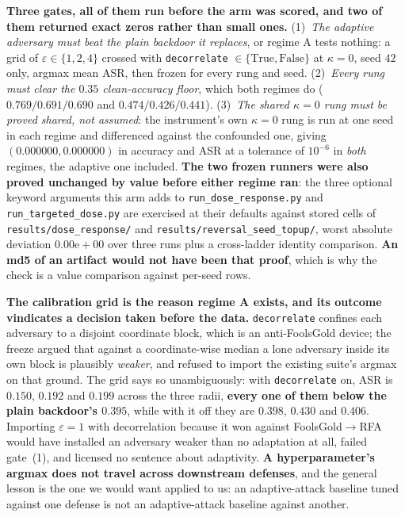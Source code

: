 \documentclass{article}
\begin{document}
\textbf{Three gates, all of them run before the arm was scored, and two of them returned exact zeros rather than small ones.} (1)~\emph{The adaptive adversary must beat the plain backdoor it replaces}, or regime A tests nothing: a grid of $\varepsilon \in \{1,2,4\}$ crossed with \texttt{decorrelate} $\in \{\text{True},\text{False}\}$ at $\kappa{=}0$, seed $42$ only, argmax mean ASR, then frozen for every rung and seed. (2)~\emph{Every rung must clear the $0.35$ clean-accuracy floor}, which both regimes do ($0.769/0.691/0.690$ and $0.474/0.426/0.441$). (3)~\emph{The shared $\kappa{=}0$ rung must be proved shared, not assumed}: the instrument's own $\kappa{=}0$ rung is run at one seed in each regime and differenced against the confounded one, giving $(0.000000, 0.000000)$ in accuracy and ASR at a tolerance of $10^{-6}$ in \emph{both} regimes, the adaptive one included. \textbf{The two frozen runners were also proved unchanged by value before either regime ran}: the three optional keyword arguments this arm adds to \texttt{run\_\allowbreak dose\_\allowbreak response.py} and \texttt{run\_\allowbreak targeted\_\allowbreak dose.py} are exercised at their defaults against stored cells of \texttt{results/\allowbreak dose\_response/} and \texttt{results/\allowbreak reversal\_seed\_topup/}, worst absolute deviation $0.00\mathrm{e}{+}00$ over three runs plus a cross-ladder identity comparison. \textbf{An md5 of an artifact would not have been that proof}, which is why the check is a value comparison against per-seed rows.

\textbf{The calibration grid is the reason regime A exists, and its outcome vindicates a decision taken before the data.} \texttt{decorrelate} confines each adversary to a disjoint coordinate block, which is an anti-FoolsGold device; the freeze argued that against a coordinate-wise median a lone adversary inside its own block is plausibly \emph{weaker}, and refused to import the existing suite's argmax on that ground. The grid says so unambiguously: with \texttt{decorrelate} on, ASR is $0.150$, $0.192$ and $0.199$ across the three radii, \textbf{every one of them below the plain backdoor's $0.395$}, while with it off they are $0.398$, $0.430$ and $0.406$. Importing $\varepsilon{=}1$ with decorrelation because it won against FoolsGold$\to$RFA would have installed an adversary weaker than no adaptation at all, failed gate~(1), and licensed no sentence about adaptivity. \textbf{A hyperparameter's argmax does not travel across downstream defenses}, and the general lesson is the one we would want applied to us: an adaptive-attack baseline tuned against one defense is not an adaptive-attack baseline against another.
\end{document}

